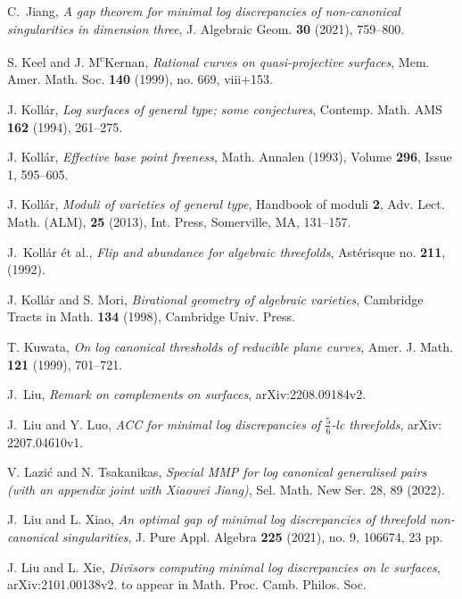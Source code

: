 \documentclass[11pt]{amsart}
\numberwithin{equation}{section}
\theoremstyle{definition}
\theoremstyle{definition}
\theoremstyle{definition}
\begin{document}
\begin{thebibliography}{ABCDE}
 C.~Jiang, \textit{A gap theorem for minimal log discrepancies of non-canonical singularities in dimension three}, J. Algebraic Geom. \textbf{30} (2021), 759--800.

 S. Keel and J. M\textsuperscript{c}Kernan, \textit{Rational curves on quasi-projective surfaces}, Mem. Amer. Math. Soc. \textbf{140} (1999), no. 669, viii+153.

 J. Koll\'ar, \textit{Log surfaces of general type; some conjectures}, Contemp. Math. AMS \textbf{162} (1994), 261--275.



 J. Koll\'{a}r, \textit{Effective base point freeness}, Math. Annalen (1993), Volume \textbf{296}, Issue 1, 595--605.


 J. Koll\'ar, \textit{Moduli of varieties of general type}, Handbook of moduli \textbf{2}, Adv. Lect. Math. (ALM), \textbf{25} (2013), Int. Press, Somerville, MA, 131--157.

 J.~Koll\'{a}r \'{e}t al., \textit{Flip and abundance for algebraic threefolds}, Ast\'{e}risque no. \textbf{211}, (1992).

 J. Koll\'{a}r and S. Mori, \textit{Birational geometry of algebraic varieties}, Cambridge Tracts in Math. \textbf{134} (1998), Cambridge Univ. Press.

 T. Kuwata, \textit{On log canonical thresholds of reducible plane curves}, Amer. J. Math. \textbf{121} (1999), 701--721.

 J.~Liu, \textit{Remark on complements on surfaces}, arXiv:2208.09184v2. 

 J.~Liu and Y. Luo, \textit{ACC for minimal log discrepancies of $\frac{5}{6}$-lc threefolds}, arXiv: 2207.04610v1.

 V. Lazi\'c and N. Tsakanikas, \textit{Special MMP for log canonical generalised pairs (with an appendix joint with Xiaowei Jiang)},  Sel. Math. New Ser. 28, 89 (2022).

 J.~Liu and L. Xiao, \textit{An optimal gap of minimal log discrepancies of threefold non-canonical singularities}, J. Pure Appl. Algebra \textbf{225} (2021), no. 9, 106674, 23 pp.

 J. Liu and L. Xie, \textit{Divisors computing minimal log discrepancies on lc surfaces}, arXiv:2101.00138v2. to appear in Math. Proc. Camb. Philos. Soc.


\end{thebibliography}
\end{document}
